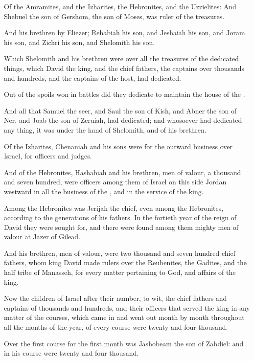 \Verse Of the Amramites, and the Izharites, the Hebronites, and the Uzzielites: \Verse And Shebuel the son of Gershom, the son of Moses, was ruler of the treasures.

\Verse And his brethren by Eliezer; Rehabiah his son, and Jeshaiah his son, and Joram his son, and Zichri his son, and Shelomith his son.

\Verse Which Shelomith and his brethren were over all the treasures of the dedicated things, which David the king, and the chief fathers, the captains over thousands and hundreds, and the captains of the host, had dedicated.

\Verse Out of the spoils won in battles did they dedicate to maintain the house of the \LORD.

\Verse And all that Samuel the seer, and Saul the son of Kish, and Abner the son of Ner, and Joab the son of Zeruiah, had dedicated; and whosoever had dedicated any thing, it was under the hand of Shelomith, and of his brethren.

\Verse Of the Izharites, Chenaniah and his sons were for the outward business over Israel, for officers and judges.

\Verse And of the Hebronites, Hashabiah and his brethren, men of valour, a thousand and seven hundred, were officers among them of Israel on this side Jordan westward in all the business of the \LORD, and in the service of the king.

\Verse Among the Hebronites was Jerijah the chief, even among the Hebronites, according to the generations of his fathers. In the fortieth year of the reign of David they were sought for, and there were found among them mighty men of valour at Jazer of Gilead.

\Verse And his brethren, men of valour, were two thousand and seven hundred chief fathers, whom king David made rulers over the Reubenites, the Gadites, and the half tribe of Manasseh, for every matter pertaining to God, and affairs of the king.


\Chapter
\Verse Now the children of Israel after their number, to wit, the chief fathers and captains of thousands and hundreds, and their officers that served the king in any matter of the courses, which came in and went out month by month throughout all the months of the year, of every course were twenty and four thousand.

\Verse Over the first course for the first month was Jashobeam the son of Zabdiel: and in his course were twenty and four thousand.

